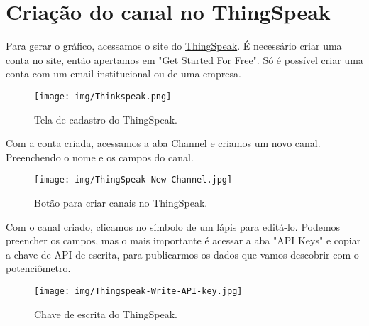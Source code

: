 \section{Criação do canal no ThingSpeak}

Para gerar o gráfico, acessamos o site do \href{https://thingspeak.mathworks.com/}{ThingSpeak}. É necessário criar uma conta no site, então apertamos em "Get Started For Free". Só é possível criar uma conta com um email institucional ou de uma empresa.

\begin{figure}[H]
    \centering
    \texttt{[image: img/Thinkspeak.png]}
    \caption{Tela de cadastro do ThingSpeak.}
    \label{fig:thingspeak-sign-up}
\end{figure}

Com a conta criada, acessamos a aba Channel e criamos um novo canal. Preenchendo o nome e os campos do canal.

\begin{figure}[H]
    \centering
    \texttt{[image: img/ThingSpeak-New-Channel.jpg]}
    \caption{Botão para criar canais no ThingSpeak.}
    \label{fig:thingspeak-create-channel}
\end{figure}

Com o canal criado, clicamos no símbolo de um lápis para editá-lo. Podemos preencher os campos, mas o mais importante é acessar a aba "API Keys" e copiar a chave de API de escrita, para publicarmos os dados que vamos descobrir com o potenciômetro.

\begin{figure}[H]
    \centering
    \texttt{[image: img/Thingspeak-Write-API-key.jpg]}
    \caption{Chave de escrita do ThingSpeak.}
    \label{fig:thingspeak-api-key}
\end{figure}